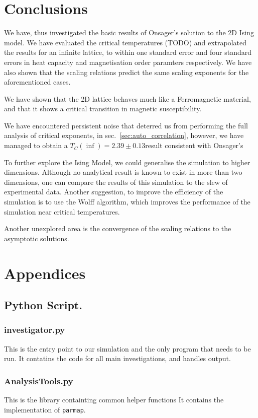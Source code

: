 \documentclass[12pt]{article}
\begin{document}
\section{Conclusions}\label{sec:conclusions}

We have, thus investigated the basic results of Onsager's solution to the 2D Ising model. We have evaluated the critical temperatures (TODO) and extrapolated the results for an infinite lattice, to within one standard error and four standard errors in heat capacity and magnetisation order paramters respectively. We have also shown that the scaling relations predict the same scaling exponents for the aforementioned cases.

We have shown that the 2D lattice behaves much like a Ferromagnetic material, and that it shows a critical transition in magnetic susceptibility.

We have encountered persistent noise that deterred us from performing the full analysis of critical exponents, in sec.~\ref{sec:auto_correlation}, however, we have managed to obtain a \(T_C(\inf) = 2.39 \pm 0.13\)result consistent with Onsager's 

To further explore the Ising Model, we could generalise the simulation to higher dimensions. Although no analytical result is known to exist in more than two dimensions, one can compare the results of this simulation to the slew of experimental data. Another suggestion, to improve the efficiency of the simulation is to use the Wolff algorithm, which improves the performance of the simulation near critical temperatures.

Another unexplored area is the convergence of the scaling relations to the asymptotic solutions. 
\section{Appendices}\label{sec:appendices}


\subsection{Python Script.}
\subsubsection{investigator.py}\label{sec:investigator}
This is the entry point to our simulation and the only program that needs to be run. It contatins the code for all main investigations, and handles output. 
\subsubsection{AnalysisTools.py}\label{sec:an_tools}
This is the library containting common helper functions It contains the implementation of \texttt{parmap}.
\end{document}
